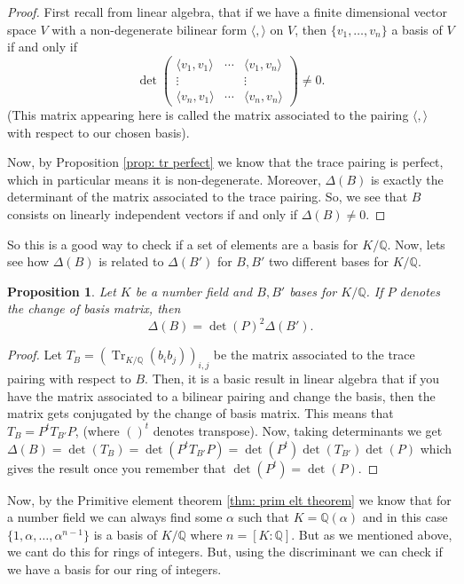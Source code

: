 \documentclass[11pt,a4paper]{report}
\theoremstyle{plain}
\newtheorem{prop}[subsection]{Proposition}
\theoremstyle{definition}
\theoremstyle{definition}
\newcommand{\Tr}{\operatorname{Tr}}
\def\QQ{\mathbb{Q}}
\def \a{\alpha}
\begin{document}
	\begin{proof}
		First recall from linear algebra, that if we have a finite dimensional vector space $V$ with a non-degenerate bilinear form $\langle, \rangle$ on $V$, then $\{v_1,\dots,v_n\}$ a basis of $V$ if and only if \[\det  \left (\begin{matrix} \langle v_1, v_1 \rangle  &\cdots& \langle v_1,v_n \rangle \\ \vdots & & \vdots \\  \langle v_n,v_1\rangle &\cdots& \langle v_n,v_n\rangle
		\end{matrix} \right ) \neq 0.\] (This matrix appearing here is called the matrix associated to the pairing $\langle,\rangle$ with respect to our chosen basis).
		
		Now, by Proposition \ref{prop: tr perfect} we know that the trace pairing is perfect, which in particular means it is non-degenerate. Moreover, $\Delta(B)$ is exactly the determinant of the matrix associated to the trace pairing. So, we see that  $B$ consists on linearly independent vectors if and only if $\Delta(B) \neq 0$.
	\end{proof}
	So this is a good way to check if a set of elements are a basis for $K/\QQ$. Now, lets see how $\Delta(B)$ is related to $\Delta(B')$ for $B,B'$ two different bases for $K/\QQ$.
	
	\begin{prop}\label{prop: disc change of basis}
		Let $K$ be a number field and $B,B'$ bases for $K/\QQ$. If $P$ denotes the change of basis matrix, then \[\Delta(B)=\det(P)^2 \Delta(B').\]
	\end{prop}
	
	\begin{proof}
		Let $T_B=(\Tr_{K/\QQ}(b_i b_j))_{i,j}$ be the matrix associated to the trace pairing with respect to $B$. Then, it is a basic result in linear algebra that if you have the matrix associated to a bilinear pairing and change the basis, then the matrix gets conjugated by the change of basis matrix. This means that $T_B=P^{t}T_{B'}P$, (where $()^t$ denotes transpose). Now, taking determinants we get $\Delta(B)=\det(T_B)=\det(P^t T_{B'}P)=\det(P^t)\det(T_{B'})\det(P)$ which gives the result once you remember that $\det(P^t)=\det(P)$. 
	\end{proof}
	
	
	Now, by the Primitive element theorem \ref{thm: prim elt theorem} we know that for a number field we can always find some $\a$ such that $K=\QQ(\a)$ and in this case $\{1,\a,\dots,\a^{n-1}\}$ is a basis of $K/\QQ$ where $n=[K:\QQ]$. But as we mentioned above, we cant do this for rings of integers. But, using the discriminant we can check if we have a basis for our ring of integers.
	
\end{document}

